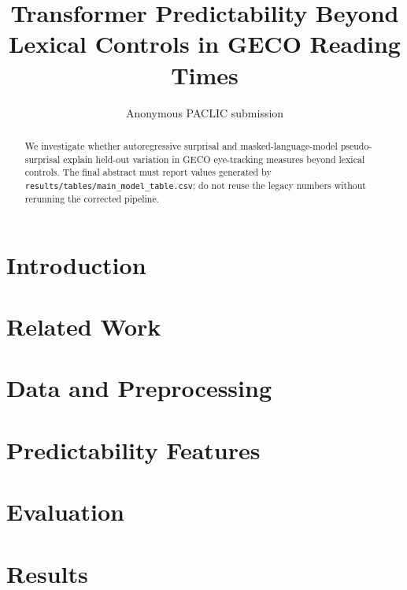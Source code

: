 \documentclass[11pt]{article}
\title{Transformer Predictability Beyond Lexical Controls in GECO Reading Times}
\author{Anonymous PACLIC submission}
\begin{document}
\maketitle

\begin{abstract}
We investigate whether autoregressive surprisal and masked-language-model
pseudo-surprisal explain held-out variation in GECO eye-tracking measures beyond
lexical controls. The final abstract must report values generated by
\texttt{results/tables/main\_model\_table.csv}; do not reuse the legacy numbers
without rerunning the corrected pipeline.
\end{abstract}

\section{Introduction}

\section{Related Work}

\section{Data and Preprocessing}

\section{Predictability Features}

\section{Evaluation}

\section{Results}
% 
\end{document}
